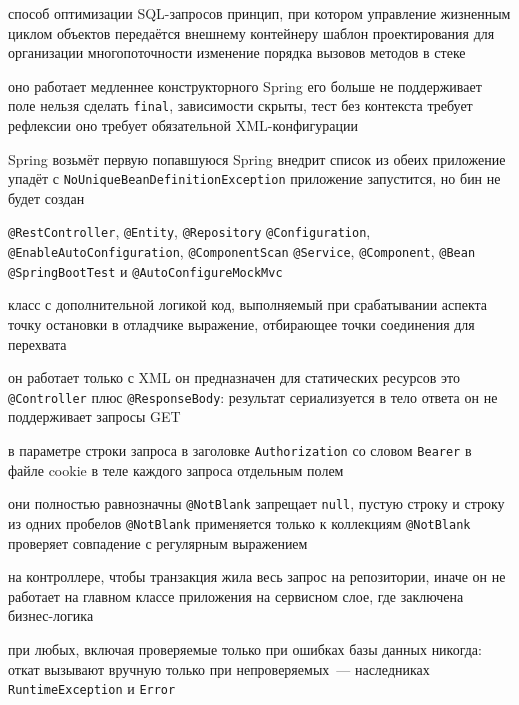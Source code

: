 \begin{enumerate}

  {способ оптимизации SQL-запросов}
  {принцип, при котором управление жизненным циклом объектов передаётся
   внешнему контейнеру}
  {шаблон проектирования для организации многопоточности}
  {изменение порядка вызовов методов в стеке}

  {оно работает медленнее конструкторного}
  {Spring его больше не поддерживает}
  {поле нельзя сделать \texttt{final}, зависимости скрыты, тест без
   контекста требует рефлексии}
  {оно требует обязательной XML-конфигурации}

  {Spring возьмёт первую попавшуюся}
  {Spring внедрит список из обеих}
  {приложение упадёт с \texttt{NoUniqueBeanDefinitionException}}
  {приложение запустится, но бин не будет создан}

  {\texttt{@RestController}, \texttt{@Entity}, \texttt{@Repository}}
  {\texttt{@Configuration}, \texttt{@EnableAutoConfiguration},
   \texttt{@ComponentScan}}
  {\texttt{@Service}, \texttt{@Component}, \texttt{@Bean}}
  {\texttt{@SpringBootTest} и \texttt{@AutoConfigureMockMvc}}

  {класс с дополнительной логикой}
  {код, выполняемый при срабатывании аспекта}
  {точку остановки в отладчике}
  {выражение, отбирающее точки соединения для перехвата}

  {он работает только с XML}
  {он предназначен для статических ресурсов}
  {это \texttt{@Controller} плюс \texttt{@ResponseBody}: результат
   сериализуется в тело ответа}
  {он не поддерживает запросы GET}

  {в параметре строки запроса}
  {в заголовке \texttt{Authorization} со словом \texttt{Bearer}}
  {в файле cookie}
  {в теле каждого запроса отдельным полем}

  {они полностью равнозначны}
  {\texttt{@NotBlank} запрещает \texttt{null}, пустую строку и строку из
   одних пробелов}
  {\texttt{@NotBlank} применяется только к коллекциям}
  {\texttt{@NotBlank} проверяет совпадение с регулярным выражением}

  {на контроллере, чтобы транзакция жила весь запрос}
  {на репозитории, иначе он не работает}
  {на главном классе приложения}
  {на сервисном слое, где заключена бизнес-логика}

  {при любых, включая проверяемые}
  {только при ошибках базы данных}
  {никогда: откат вызывают вручную}
  {только при непроверяемых~--- наследниках \texttt{RuntimeException} и
   \texttt{Error}}

\end{enumerate}
